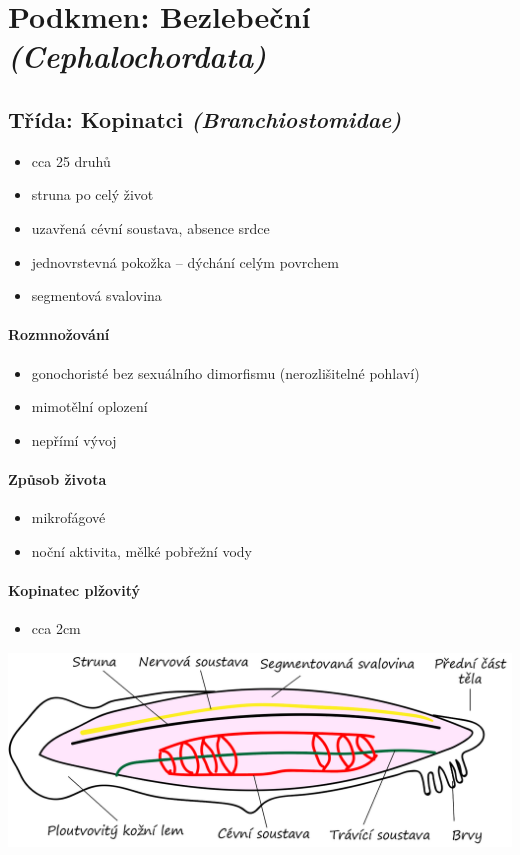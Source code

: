 \section{Podkmen: Bezlebeční \textit{(Cephalochordata)}}
\subsection{Třída: Kopinatci \textit{(Branchiostomidae)}}
\begin{itemize}
\item cca 25 druhů
\item struna po celý život
\item uzavřená cévní soustava, absence srdce
\item jednovrstevná pokožka -- dýchání celým povrchem
\item segmentová svalovina
\end{itemize}

\paragraph{Rozmnožování}
\begin{itemize}
\item gonochoristé bez sexuálního dimorfismu (nerozlišitelné pohlaví)
\item mimotělní oplození
\item nepřímí vývoj
\end{itemize}

\paragraph{Způsob života}
\begin{itemize}
\item mikrofágové
\item noční aktivita, mělké pobřežní vody
\end{itemize}

\paragraph{Kopinatec plžovitý}
\begin{itemize}
\item cca 2cm
\end{itemize}
\includegraphics[width=1\textwidth]{pictures/kopinatec.png}

